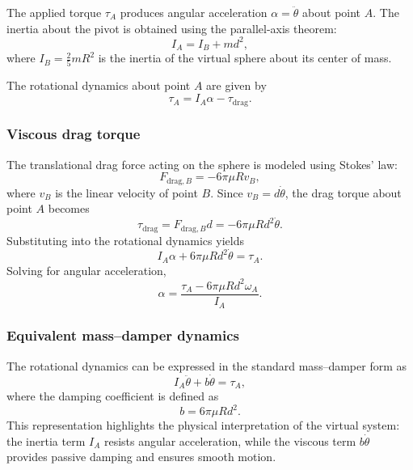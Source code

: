 \documentclass[journal]{IEEEtran}
\begin{document}
The applied torque $\tau_A$ produces angular acceleration $\alpha = \ddot{\theta}$ about point $A$. The inertia about the pivot is obtained using the parallel-axis theorem:
%
\begin{equation}
I_A = I_B + md^2,
\end{equation}
%
where $I_B = \frac{2}{5} m R^2$ is the inertia of the virtual sphere about its center of mass.

The rotational dynamics about point $A$ are given by
%
\begin{equation}
\tau_A = I_A \alpha - \tau_{\mathrm{drag}}.
\end{equation}
%
\subsubsection{Viscous drag torque}

The translational drag force acting on the sphere is modeled using Stokes' law:
%
\begin{equation}
F_{\mathrm{drag},B} = -6\pi \mu R v_B,
\end{equation}
%
where $v_B$ is the linear velocity of point $B$. Since $v_B = d\dot{\theta}$, the drag torque about point $A$ becomes
%
\begin{equation}
\tau_{\mathrm{drag}} = F_{\mathrm{drag},B} d = -6\pi \mu R d^2 \dot{\theta}.
\end{equation}
%
Substituting into the rotational dynamics yields
%
\begin{equation}
I_A \alpha + 6\pi \mu R d^2 \dot{\theta} = \tau_A.
\end{equation}
%
Solving for angular acceleration,
%
\begin{equation}
\alpha = \frac{\tau_A - 6\pi \mu R d^2 \omega_A}{I_A}.
\end{equation}
%
\subsubsection{Equivalent mass--damper dynamics}

The rotational dynamics can be expressed in the standard mass--damper form as
%
\begin{equation}
I_A \ddot{\theta} + b \dot{\theta} = \tau_A,
\label{eq:rot_dyn_compact}
\end{equation}
%
where the damping coefficient is defined as
%
\begin{equation}
b = 6\pi \mu R d^2.
\end{equation}
%
This representation highlights the physical interpretation of the virtual system: the inertia term $I_A$ resists angular acceleration, while the viscous term $b \dot{\theta}$ provides passive damping and ensures smooth motion.
\end{document}
